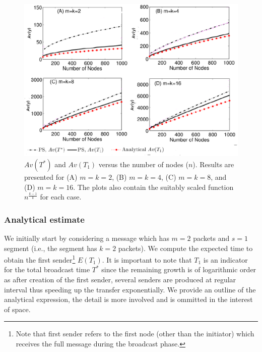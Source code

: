 \begin{figure}[htbp] 
\centering
\includegraphics[scale=0.36]{./texfiles/Chapter_3/netsci/figs1/segSizeVsDelay_nrTrans_varyN_Mall_push_pull2.eps}
\caption{$Av(T^*)$ and $Av(T_1)$ versus the number of nodes ($n$). Results are presented for (A) $m=k=2$, (B) $m=k=4$, (C) $m=k=8$, and (D) $m=k=16$. The plots also contain the suitably scaled function $n^{\frac{k-1}{k}}$ for each case.}
\label{segSizeVsDelay_nrTrans_varyN_Mall_push_pull}
\end{figure}
\subsubsection{Analytical estimate}

We initially start by considering a message which has $m=2$ packets and $s=1$ segment (i.e., the segment has $k=2$ packets). We compute the expected time to 
obtain the first sender\footnote{
Note that first sender refers to the first node (other than the initiator) which 
receives the full message during the broadcast phase.
} $E(T_1)$. 
It is important to note that $T_1$ is an indicator for the total broadcast time $T^*$ since the remaining growth is of logarithmic order as after creation of the first sender, 
several senders are produced at regular interval thus speeding
up the transfer exponentially. 
We provide an outline of the analytical expression, the detail is more involved and is ommitted in the interest of space. 
 
